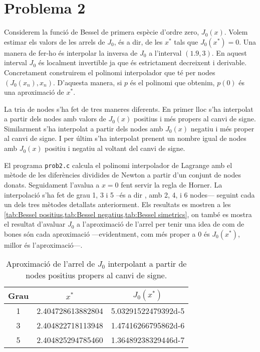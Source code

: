 \documentclass[12pt]{article}
\numberwithin{table}{section}
\numberwithin{figure}{section}
\numberwithin{equation}{section}
\begin{document}
\newpage

\section{Problema 2}
Considerem la funció de Bessel de primera espècie d'ordre zero, $J_0(x)$. Volem estimar els valors de les arrels de \( J_0 \), és a dir, de les \( x^{\ast} \) tals que \( J_0(x^{\ast}) = 0 \). Una manera de fer-ho és interpolar la inversa de \( J_0 \) a l'interval \( (1.9, 3) \). En aquest interval \( J_0 \) és localment invertible ja que és estrictament decreixent i derivable. Concretament construirem el polinomi interpolador que té per nodes \( (J_0(x_n), x_n) \). D'aquesta manera, si \( p \) és el polinomi que obtenim, \( p(0) \) és una aproximació de \( x^{\ast} \).

La tria de nodes s'ha fet de tres maneres diferents. En primer lloc s'ha interpolat a partir dels nodes amb valors de \( J_0(x) \) positius i més propers al canvi de signe. Similarment s'ha interpolat a partir dels nodes amb \( J_0(x) \) negatiu i més proper al canvi de signe. I per últim s'ha interpolat prenent un nombre igual de nodes amb \( J_0(x) \) positiu i negatiu al voltant del canvi de signe.    

El programa \texttt{prob2.c} calcula el polinomi interpolador de Lagrange amb el mètode de les diferències dividides de Newton a partir d'un conjunt de nodes donats. Seguidament l'avalua a \( x=0 \) fent servir la regla de Horner. La interpolació s'ha fet de grau 1, 3 i 5 --és a dir , amb 2, 4, i 6 nodes--- seguint cada un dels tres mètodes detallats anteriorment. Els resultats es mostren a les \cref{tab:Bessel positius,tab:Bessel negatius,tab:Bessel simetrics}, on també es mostra el resultat d'avaluar \( J_0 \) a l'aproximació de l'arrel per tenir una idea de com de bones són cada aproximació ---evidentment, com més proper a 0 és \( J_0(x^{\ast}) \), millor és l'aproximació---. 

\begin{table}[htb]
	\sffamily \small	\centering
	\caption{Aproximació de l'arrel de \( J_0 \) interpolant a partir de nodes positius propers al canvi de signe. }	
	\label{tab:Bessel positius}
	\begin{tabular}{cS[table-parse-only]S[table-parse-only]}
		\toprule
		{Grau} & { \( x^{\ast} \) } & { \( J_0(x^{\ast}) \) } \\
		 & 2.404728613882804 & 5.03291522479392d-5\\
		3 & 2.404822718113948 & 1.47416266795862d-6\\
		5 & 2.404825294785460 & 1.36489238329446d-7\\
	\end{tabular}
\end{table}
\end{document}
